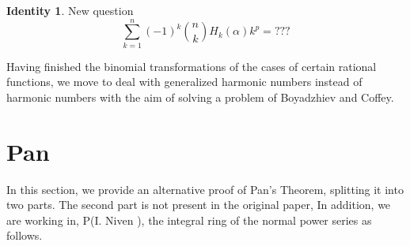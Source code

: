 \documentclass[a4paper,10pt,oneside]{article}
\newcommand{\dsum}[3]{\displaystyle \sum_{#1}^{#2}{#3}}
\theoremstyle{definition}
\newtheorem{identity2}{Identity}[section]
\theoremstyle{remark}
\newcommand{\idi}[1]{\begin{identity2}{#1}\end{identity2}}
\begin{document}
 \idi{New question
   \begin{equation}
\dsum{k=1}{n}{(-1)^k\binom{n}{k}H_k(\alpha)k^p}=???\label{new}
\end{equation}}


Having finished the binomial transformations of the cases of certain rational functions, we move 
to  deal with generalized harmonic numbers instead of harmonic numbers with the aim of solving a problem of  Boyadzhiev and Coffey.

{\section{Pan}}


In this section, we provide an alternative proof of Pan's Theorem, splitting it into two parts. The second part is not present in the original paper, In addition, we are working in, P(I. Niven \cite{niven}),  the integral ring of the normal power series as follows.\par
\end{document}

